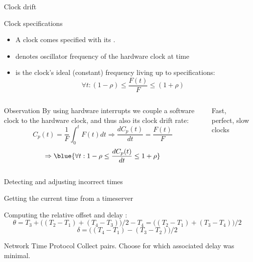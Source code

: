 \begin{slide}{Clock drift}
  \begin{block}{Clock specifications}
    \begin{itemize}\tightlist
    \item A clock comes specified with its  \mathexpr{\rho}.
    \item {} denotes oscillator frequency of the hardware clock at time 
    \item {} is the clock's ideal (constant) frequency \mathexpr{\Rightarrow} living up to
      specifications: 
      \[ \forall t: (1 - \rho) \leq \frac{F(t)}{F} \leq (1 + \rho) \]
    \end{itemize}
  \end{block}
  \begin{columns}[T]
    \begin{column}{0.5\textwidth}
      \begin{block}{Observation}
        By using hardware interrupts we couple a software clock to the hardware clock, and thus also its clock
        drift rate:
        \[ C_p(t) = \frac{1}{F} \int_0^t F(t) dt \Rightarrow \frac{dC_p(t)}{dt} = \frac{F(t)}{F} \]
        \[ \Rightarrow \blue{\forall t: 1 - \rho \leq \frac{dC_p(t)}{dt} \leq 1 + \rho}\]
      \end{block}
    \end{column}
    \begin{column}{0.45\textwidth}    
      \begin{block}{Fast, perfect, slow clocks}
        \begin{centerfig}
        \end{centerfig}
      \end{block}
    \end{column}
  \end{columns}
\end{slide}
\begin{slide}{Detecting and adjusting incorrect times}
  \begin{block}{Getting the current time from a timeserver}
    \begin{centerfig}
    \end{centerfig}
  \end{block}
  \begin{block}{Computing the relative offset \mathexpr{\theta} and delay \mathexpr{\delta}}
    : 
    \[
    \theta = T_3 + \bigl(( T_2 - T_1 ) + ( T_4 - T_3 )\bigr)/{2} - T_4 = \bigl(( T_2 - T_1 ) + ( T_3 - T_4 )\bigr)/{2}
    \]
    \[
    \delta = \bigl((T_4-T_1) - (T_3 -T_2)\bigr)/{2}
    \]
  \end{block}
  \begin{exampleblock}{Network Time Protocol}
    Collect \mathexpr{(\theta,\delta)} pairs. Choose \mathexpr{\theta} for which associated delay
    \mathexpr{\delta} was minimal.
  \end{exampleblock}
\end{slide}
